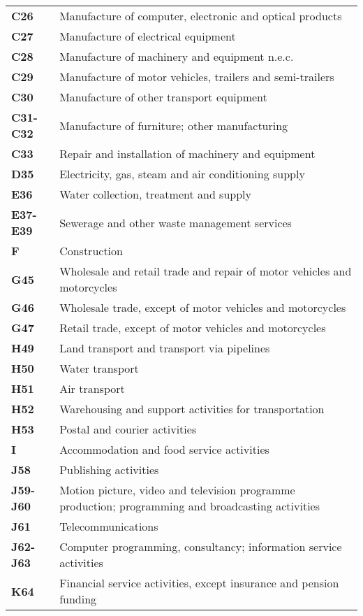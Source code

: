 \documentclass[11pt,a4paper]{article}
\begin{document}
\begin{table}[!h]
\begin{tabular}{ll}
\textbf{C26} &{Manufacture of computer, electronic and optical products}\\
\textbf{C27} &{Manufacture of electrical equipment}\\
\textbf{C28} &{Manufacture of machinery and equipment n.e.c.}\\
\textbf{C29} &{Manufacture of motor vehicles, trailers and semi-trailers}\\
\textbf{C30} &{Manufacture of other transport equipment}\\
\textbf{C31-C32} &{Manufacture of furniture; other manufacturing}\\
\textbf{C33} &{Repair and installation of machinery and equipment}\\
\textbf{D35} &{Electricity, gas, steam and air conditioning supply}\\
\textbf{E36} &{Water collection, treatment and supply}\\
\textbf{E37-E39} &{Sewerage and other waste management services}\\
\textbf{F} &{Construction}\\
\textbf{G45} &{Wholesale and retail trade and repair of motor vehicles and motorcycles}\\
\textbf{G46} &{Wholesale trade, except of motor vehicles and motorcycles}\\
\textbf{G47} &{Retail trade, except of motor vehicles and motorcycles}\\
\textbf{H49} &{Land transport and transport via pipelines}\\
\textbf{H50} &{Water transport}\\
\textbf{H51} &{Air transport}\\
\textbf{H52} &{Warehousing and support activities for transportation}\\
\textbf{H53} &{Postal and courier activities}\\
\textbf{I} &{Accommodation and food service activities}\\
\textbf{J58} &{Publishing activities}\\
\textbf{J59-J60} &{Motion picture, video and television programme production; programming and broadcasting activities}\\
\textbf{J61} &{Telecommunications}\\
\textbf{J62-J63} &{Computer programming, consultancy; information service activities}\\
\textbf{K64} &{Financial service activities, except insurance and pension funding}\\

\end{tabular}
\end{table}
\end{document}
